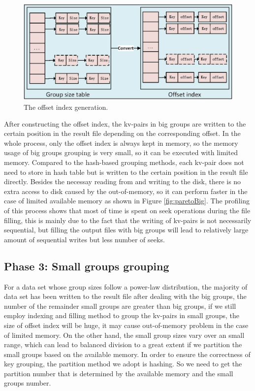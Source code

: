 \begin{figure}
\includegraphics[width=.48\textwidth]{fig/convert}
\caption{The offset index generation.}
\label{fig:convert}
\end{figure}


 
After constructing the offset index, the kv-pairs in big groups are written to the certain position in the result file depending on the corresponding offset. In the whole process, only the offset index is always kept in memory, so the memory usage of big groups grouping is very small, so it can be executed with limited memory. Compared to the hash-based grouping methods, each kv-pair does not need to store in hash table but is written to the certain position in the result file directly. Besides the necessay reading from and writing to the disk, there is no extra access to disk caused by the out-of-memory, so it can perform faster in the case of limited available memory as shown in Figure \ref{fig:paretoBig}. The profiling of this process shows that most of time is spent on seek operations during the file filling, this is mainly due to the fact that the writing of kv-pairs is not necessarily sequential, but filling the output files with big groups will lead to relatively large amount of sequential writes but less number of seeks.

\subsection{Phase 3: Small groups grouping}

For a data set whose group sizes follow a power-law distribution, the majority of data set has been written to the result file after dealing with the big groups, the number of the remainder small groups are greater than big groups, if we still employ indexing and filling method to group the kv-pairs in small groups, the size of offset index will be huge, it may cause out-of-memory problem in the case of limited memory. On the other hand, the small group sizes vary over an small range, which can lead to balanced division to a great extent if we partition the small groups based on the available memory. In order to ensure the correctness of key grouping, the partition method we adopt is hashing. So we need to get the partition number that is determined by the available memory and the small groups number. 

